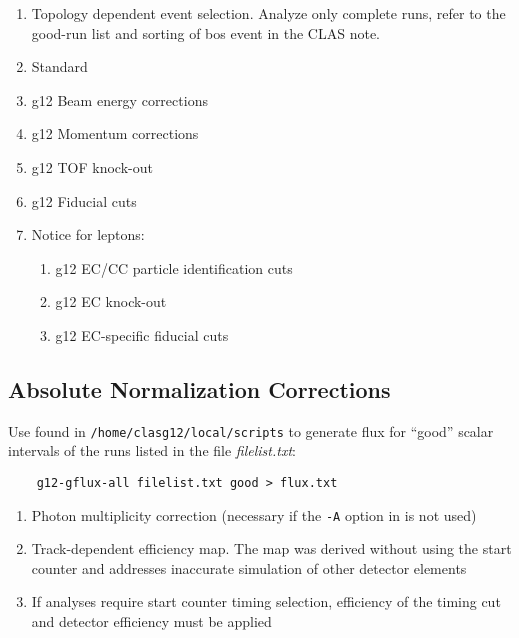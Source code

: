 \documentclass[10pt,twocolumn,oneside,letterpaper]{article}
\begin{document}
\begin{enumerate}
    \item Topology dependent event selection. Analyze only complete runs, refer to the good-run list and sorting of bos event in the CLAS note.
    \item Standard 
    \item g12 Beam energy corrections
    \item g12 Momentum corrections
    \item g12 TOF knock-out
    \item g12 Fiducial cuts
    \item Notice for leptons:
    \begin{enumerate}
        \item g12 EC/CC particle identification cuts
        \item g12 EC knock-out
        \item g12 EC-specific fiducial cuts
    \end{enumerate}
\end{enumerate}

\subsection{Absolute Normalization Corrections}

Use  found in \verb+/home/clasg12/local/scripts+ to generate flux for ``good'' scalar intervals of the runs listed in the file \textit{filelist.txt}:
\begin{verbatim}
    g12-gflux-all filelist.txt good > flux.txt
\end{verbatim}

\begin{enumerate}
    \item Photon multiplicity correction (necessary if the \verb|-A| option in  is not used)
    \item Track-dependent efficiency map. The map was derived without using the start counter and addresses inaccurate simulation of other detector elements
    \item If analyses require start counter timing selection, efficiency of the timing cut and detector efficiency must be applied
\end{enumerate}
\end{document}
